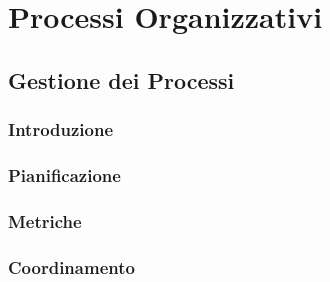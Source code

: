 \section{Processi Organizzativi}

\subsection{Gestione dei Processi}
\subsubsection{Introduzione}
\subsubsection{Pianificazione}
\subsubsection{Metriche}
\subsubsection{Coordinamento}